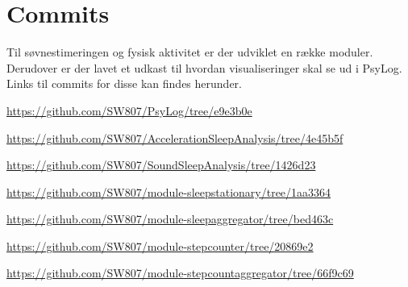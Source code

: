 \chapter{Commits}
Til søvnestimeringen og fysisk aktivitet er der udviklet en række moduler.
Derudover er der lavet et udkast til hvordan visualiseringer skal se ud i PsyLog.
Links til commits for disse kan findes herunder.

\begin{description}[style=nextline]
	\item[PsyLog - Viewbranch] \url{https://github.com/SW807/PsyLog/tree/e9e3b0e}
	\item[AccelerationSleepAnalysis] \url{https://github.com/SW807/AccelerationSleepAnalysis/tree/4e45b5f}
	\item[SoundSleepAnalysis] \url{https://github.com/SW807/SoundSleepAnalysis/tree/1426d23}
	\item[module-sleepstationary] \url{https://github.com/SW807/module-sleepstationary/tree/1aa3364}
	\item[module-sleepaggregator] \url{https://github.com/SW807/module-sleepaggregator/tree/bed463c}
	\item[module-stepcounter] \url{https://github.com/SW807/module-stepcounter/tree/20869e2}
	\item[module-stepcountaggregator] \url{https://github.com/SW807/module-stepcountaggregator/tree/66f9c69}
\end{description}